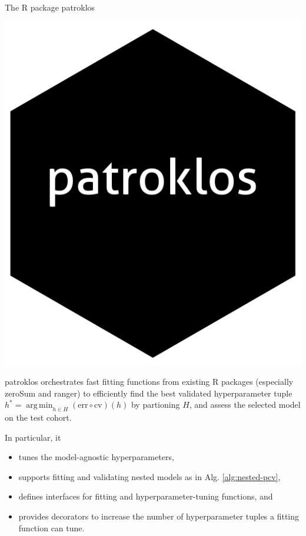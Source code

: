 \documentclass[10pt, aspectratio=169]{beamer}
\DeclareMathOperator*{\argmin}{arg\,min}
\begin{document}
\begin{frame}{The R package patroklos}
  \begin{minipage}{0.15\textwidth}
    \centering
    \includegraphics[width=\textwidth]{figs/logo.png}
  \end{minipage}
  \hfill
  \begin{minipage}{0.8\textwidth}
    \raggedright
    patroklos \cite{patroklos} orchestrates fast fitting functions from existing 
    R packages (especially zeroSum \cite{zerosumR} and ranger) to efficiently 
    find the best validated hyperparameter tuple
    $h^* = \argmin_{h \in H} (\text{err} \circ \text{cv})(h)$ by partioning 
    $H$, and assess the selected model on the test cohort.
  \end{minipage}

  In particular, it 
  \begin{itemize}
    \item tunes the model-agnostic hyperparameters,
    \item supports fitting and validating nested models as in Alg. \ref{alg:nested-pcv},
    \item defines interfaces for fitting and hyperparameter-tuning functions, and 
    \item provides decorators to increase the number of hyperparameter tuples 
      a fitting function can tune.
  \end{itemize}
\end{frame}
\end{document}
